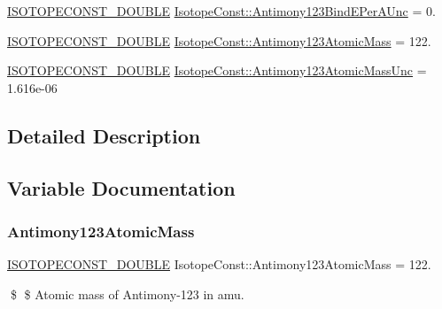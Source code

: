 \begin{DoxyCompactItemize}
\mbox{\hyperlink{group___isotope_const-_macros_ga8f45a7272ce02c0b4c65c44636ed719a}{I\+S\+O\+T\+O\+P\+E\+C\+O\+N\+S\+T\+\_\+\+D\+O\+U\+B\+LE}} \mbox{\hyperlink{group___isotope_const-_antimony-_sb123_ga3630433ab5a8b1f916502694f7ba6773}{Isotope\+Const\+::\+Antimony123\+Bind\+E\+Per\+A\+Unc}} = 0.
\item 
\mbox{\hyperlink{group___isotope_const-_macros_ga8f45a7272ce02c0b4c65c44636ed719a}{I\+S\+O\+T\+O\+P\+E\+C\+O\+N\+S\+T\+\_\+\+D\+O\+U\+B\+LE}} \mbox{\hyperlink{group___isotope_const-_antimony-_sb123_gad1bf24cd97177ec53ed90f3c0e75c6fc}{Isotope\+Const\+::\+Antimony123\+Atomic\+Mass}} = 122.
\item 
\mbox{\hyperlink{group___isotope_const-_macros_ga8f45a7272ce02c0b4c65c44636ed719a}{I\+S\+O\+T\+O\+P\+E\+C\+O\+N\+S\+T\+\_\+\+D\+O\+U\+B\+LE}} \mbox{\hyperlink{group___isotope_const-_antimony-_sb123_ga70a6429d1a48066c9c3735cd6adb8ea6}{Isotope\+Const\+::\+Antimony123\+Atomic\+Mass\+Unc}} = 1.\+616e-\/06
\end{DoxyCompactItemize}


\subsection{Detailed Description}


\subsection{Variable Documentation}
\mbox{\label{group___isotope_const-_antimony-_sb123_gad1bf24cd97177ec53ed90f3c0e75c6fc}} 
\subsubsection{\texorpdfstring{Antimony123\+Atomic\+Mass}{Antimony123AtomicMass}}
{\footnotesize\ttfamily \mbox{\hyperlink{group___isotope_const-_macros_ga8f45a7272ce02c0b4c65c44636ed719a}{I\+S\+O\+T\+O\+P\+E\+C\+O\+N\+S\+T\+\_\+\+D\+O\+U\+B\+LE}} Isotope\+Const\+::\+Antimony123\+Atomic\+Mass = 122.}

\$ \$ Atomic mass of Antimony-\/123 in amu. \mbox{\label{group___isotope_const-_antimony-_sb123_ga70a6429d1a48066c9c3735cd6adb8ea6}} 
